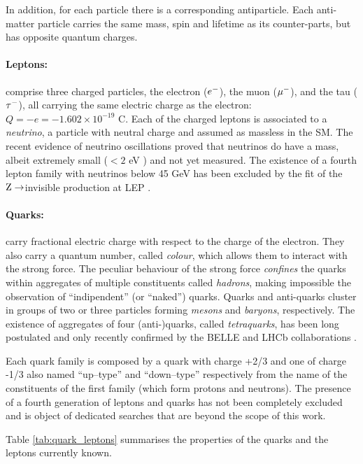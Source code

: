 In addition, for each particle there is a corresponding antiparticle. Each anti-matter particle carries the same mass, spin and lifetime as its counter-parts, but has opposite quantum charges.

\paragraph{Leptons:} comprise three charged particles, the electron ($e\-$), the muon ($\mu\-$), and the tau ($\tau\-$), all carrying the same electric charge as the electron: $Q = -e = -1.602 \times 10^{-19}$ C. Each of the charged leptons is associated to a \emph{neutrino}, a particle with neutral charge and assumed as massless in the SM. The recent evidence of neutrino oscillations \cite{Agafonova:2010dc} proved that neutrinos do have a mass, albeit extremely small ($< 2$ eV \cite{pdg}) and not yet measured. The existence of a fourth lepton family with neutrinos below 45 GeV has been excluded by the fit of the $\Z\To$invisible production at LEP \cite{ALEPH:2005ab}. 

\paragraph{Quarks:} carry fractional electric charge with respect to the charge of the electron. They also carry a quantum number, called \emph{colour}, which allows them to interact with the strong force. The peculiar behaviour of the strong force \emph{confines} the quarks within aggregates of multiple constituents called \emph{hadrons}, making impossible the observation of ``indipendent'' (or ``naked'') quarks. Quarks and anti-quarks cluster in groups of two or three particles forming \emph{mesons} and \emph{baryons}, respectively. The existence of aggregates of four (anti-)quarks, called \emph{tetraquarks}, has been long postulated and only recently confirmed by the BELLE \cite{Choi:2007wga} and LHCb collaborations \cite{Aaij:2014jqa}.

Each quark family is composed by a quark with charge +2/3 and one of charge -1/3 also named ``up--type'' and ``down--type'' respectively from the name of the constituents of the first family (which form protons and neutrons). The presence of a fourth generation of leptons and quarks has not been completely excluded and is object of dedicated searches that are beyond the scope of this work.

Table \ref{tab:quark_leptons} summarises the properties of the quarks and the leptons currently known.

